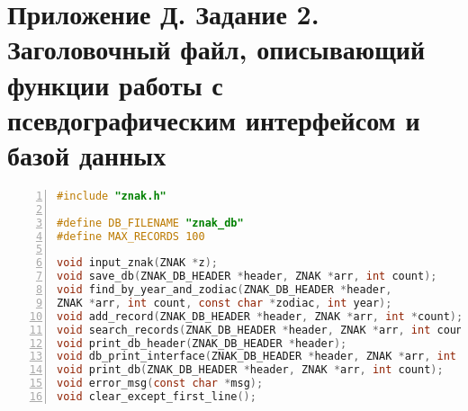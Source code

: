 \section*{Приложение Д. Задание 2. Заголовочный файл, описывающий функции работы с псевдографическим интерфейсом и базой данных}

\begin{lstlisting}[language=C,numbers=left]
#include "znak.h"

#define DB_FILENAME "znak_db"
#define MAX_RECORDS 100

void input_znak(ZNAK *z);
void save_db(ZNAK_DB_HEADER *header, ZNAK *arr, int count);
void find_by_year_and_zodiac(ZNAK_DB_HEADER *header, 
ZNAK *arr, int count, const char *zodiac, int year);
void add_record(ZNAK_DB_HEADER *header, ZNAK *arr, int *count);
void search_records(ZNAK_DB_HEADER *header, ZNAK *arr, int count);
void print_db_header(ZNAK_DB_HEADER *header);
void db_print_interface(ZNAK_DB_HEADER *header, ZNAK *arr, int count);
void print_db(ZNAK_DB_HEADER *header, ZNAK *arr, int count);
void error_msg(const char *msg);
void clear_except_first_line();
\end{lstlisting}